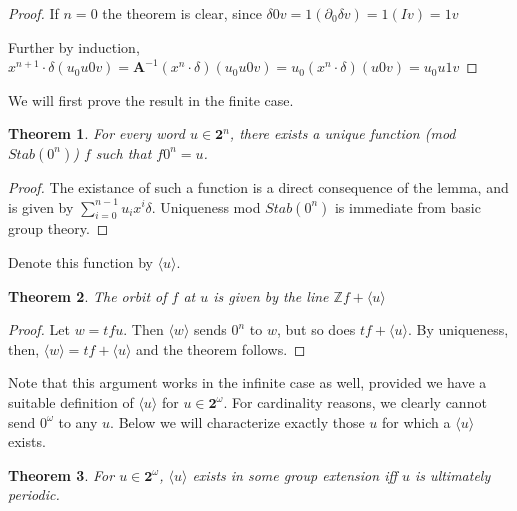 \documentclass[12pt]{article}
\newcommand{\Z}{\mathbb{Z}}
\newcommand{\2}{\textbf{2}}
\newcommand{\Am}{\textbf{A}}
\newcommand{\del}{\partial}
\newtheorem{thm}{Theorem}
\begin{document}
\begin{proof}
  If $n=0$ the theorem is clear, since 
  $\delta 0v = 1 (\del_0 \delta v) = 1 (I v) = 1v$

  Further by induction, 
  $x^{n+1} \cdot \delta (u_0u0v) = 
  \Am^{-1} (x^n \cdot \delta) (u_0u0v) =
  u_0 (x^n \cdot \delta) (u0v) =
  u_0u1v$
\end{proof}

We will first prove the result in the finite case.

\begin{thm}
  For every word $u \in \2^n$, there exists a unique function
  (mod $Stab(0^n)$) $f$ such that $f 0^n = u$.
\end{thm}

\begin{proof}
  The existance of such a function is a direct consequence of the lemma,
  and is given by $\sum_{i=0}^{n-1} u_i x^i \delta$.
  Uniqueness mod $Stab(0^n)$ is immediate from basic group theory.
\end{proof}

Denote this function by $\langle u \rangle$. 

\begin{thm}
  The orbit of $f$ at $u$ is given by the line $\Z f + \langle u \rangle$
\end{thm}

\begin{proof}
  Let $w = tf u$. Then $\langle w \rangle$ sends $0^n$ to $w$, 
  but so does $tf + \langle u \rangle$. By uniqueness, then,
  $\langle w \rangle = tf + \langle u \rangle$ and the theorem follows.
\end{proof}

Note that this argument works in the infinite case as well, provided 
we have a suitable definition of $\langle u \rangle$ for $u \in \2^\omega$.
For cardinality reasons, we clearly cannot send $0^\omega$ to any $u$.
Below we will characterize exactly those $u$ for which a $\langle u \rangle$
exists.

\begin{thm}
  For $u \in \2^\omega$, $\langle u \rangle$ exists in some group extension
  iff $u$ is ultimately periodic.
\end{thm}
\end{document}
